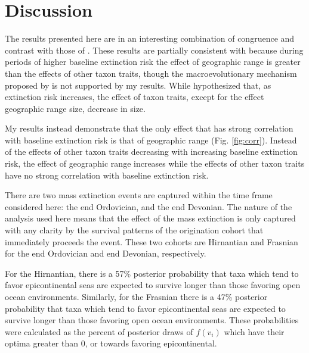 \documentclass[12pt,letterpaper]{article}
\begin{document}
\section{Discussion}

The results presented here are in an interesting combination of congruence and contrast with those of \citet{Jablonski1987}.  These results are partially consistent with \citet{Jablonski1987} because during periods of higher baseline extinction risk the effect of geographic range is greater than the effects of other taxon traits, though the macroevolutionary mechanism proposed by \citet{Jablonski1987} is not supported by my results. While \citet{Jablonski1987} hypothesized that, as extinction risk increases, the effect of taxon traits, except for the effect geographic range size, decrease in size. 

My results instead demonstrate that the only effect that has strong correlation with baseline extinction risk is that of geographic range (Fig. \ref{fig:corr}). Instead of the effects of other taxon traits decreasing with increasing baseline extinction risk, the effect of geographic range increases while the effects of other taxon traits have no strong correlation with baseline extinction risk. 

There are two mass extinction events are captured within the time frame considered here: the end Ordovician, and the end Devonian. The nature of the analysis used here means that the effect of the mass extinction is only captured with any clarity by the survival patterns of the origination cohort that immediately proceeds the event. These two cohorts are Hirnantian and Frasnian for the end Ordovician and end Devonian, respectively.

For the Hirnantian, there is a 57\% posterior probability that taxa which tend to favor epicontinental seas are expected to survive longer than those favoring open ocean environments. Similarly, for the Frasnian there is a 47\% posterior probability that taxa which tend to favor epicontinental seas are expected to survive longer than those favoring open ocean environments. These probabilities were calculated as the percent of posterior draws of \(f(v_{i})\) which have their optima greater than 0, or towards favoring epicontinental. 
\end{document}
